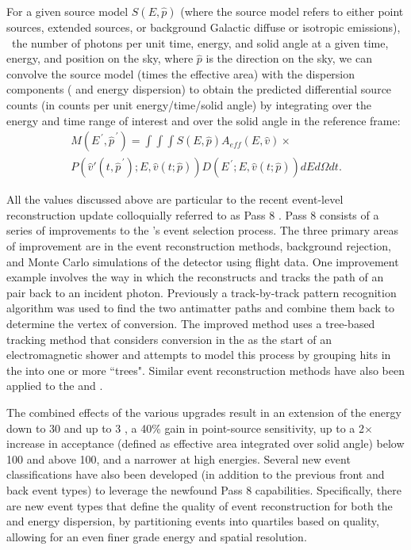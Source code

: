 For a given \gam{} source model $S(E,\hat{p})$ (where the source model refers to either point sources, extended sources, or background Galactic diffuse or isotropic emissions), \ie{}\ the number of photons per unit time, energy, and solid angle at a given time, energy, and position on the sky, where $\hat{p}$ is the direction on the sky, we can convolve the source model (times the effective area) with the dispersion components (\psf{} and  energy dispersion) to obtain the predicted differential source counts (in counts per unit energy/time/solid angle) by integrating over the energy and time range of interest and over the solid angle in the \lat{} reference frame:
\begin{align}\label{eq:exCountsPred}
	M(E^{\,\prime},\hat{p}^{\,\prime}) =  \int \int \int S(E,\hat{p}) A _{eff}(E,\hat{v}) \times \nonumber \\
	P(\hat{v}'(t,\hat{p}^{\,\prime}); E, \hat{v}(t;\hat{p})) D(E^{\,\prime}; E, \hat{v}(t;\hat{p})) dE d\Omega dt.
\end{align}

All the values discussed above are particular to the recent \lat{} event-level reconstruction update colloquially referred to as Pass 8 \citep{atwood13}. Pass 8 consists of a series of improvements to the \lat{}'s event selection process. The three primary areas of improvement are in the event reconstruction methods, background rejection, and Monte Carlo simulations of the detector using flight data. One improvement example involves the way in which the  \lat{} reconstructs and tracks the path of an \ee{} pair back to an incident photon. Previously a track-by-track pattern recognition algorithm was used to find the two antimatter paths and combine them back to determine the vertex of conversion. The improved method uses a tree-based tracking method that considers conversion in the \tkr{} as the start of an electromagnetic shower and attempts to model this process by grouping hits in the \tkr{} into one or more ``trees". Similar event reconstruction methods have also been applied to the \acd{} and \calo{}. 

The combined effects of the various upgrades result in an extension of the energy down to 30\mev{} and up to 3\tev{} \cite[see Chapter \ref{chap:2FHL} for applications]{Bruel12}, a 40\% gain in point-source sensitivity, up to a 2$\times$ increase in acceptance (defined as effective area integrated over solid angle) below 100\mev{} and above 100\gev{}, and a narrower \psf{} at high energies. Several new event classifications have also been developed (in addition to the previous front and back event types) to leverage the newfound  Pass 8 \lat{} capabilities. Specifically, there are new event types that define the quality of event reconstruction for both the \psf{} and energy dispersion, by partitioning events into quartiles based on quality, allowing for an even finer grade energy and spatial resolution.

